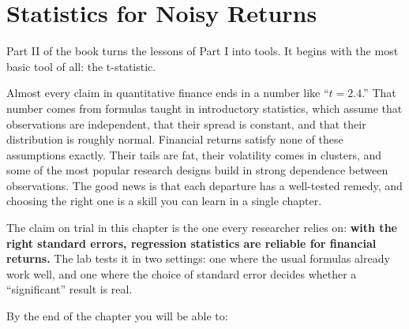 \makeatletter
{}
\makeatother

\chapter{Statistics for Noisy Returns}
\label{ch:03}

Part II of the book turns the lessons of Part I into tools. It begins with the most basic tool of all: the t-statistic.

Almost every claim in quantitative finance ends in a number like ``$t = 2.4$.'' That number comes from formulas taught in introductory statistics, which assume that observations are independent, that their spread is constant, and that their distribution is roughly normal. Financial returns satisfy none of these assumptions exactly. Their tails are fat, their volatility comes in clusters, and some of the most popular research designs build in strong dependence between observations. The good news is that each departure has a well-tested remedy, and choosing the right one is a skill you can learn in a single chapter.

The claim on trial in this chapter is the one every researcher relies on: \textbf{with the right standard errors, regression statistics are reliable for financial returns.} The lab tests it in two settings: one where the usual formulas already work well, and one where the choice of standard error decides whether a ``significant'' result is real.

By the end of the chapter you will be able to:

